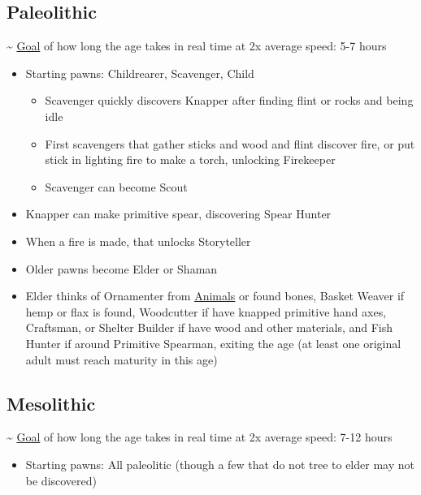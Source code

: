 \documentclass[11pt]{article}
\begin{document}
\subsection{Paleolithic}
\label{sec:org53bf398}
\textasciitilde{} \hyperref[orgd0c5ba7]{Goal} of how long the age takes in real time at 2x average speed: 5-7 hours\\
\begin{itemize}
\item Starting pawns: Childrearer, Scavenger, Child\\
\begin{itemize}
\item Scavenger quickly discovers Knapper after finding flint or rocks and being idle\\
\item First scavengers that gather sticks and wood and flint discover fire, or put stick in lighting fire to make a torch, unlocking Firekeeper\\
\item Scavenger can become Scout\\
\end{itemize}
\item Knapper can make primitive spear, discovering Spear Hunter\\
\item When a fire is made, that unlocks Storyteller\\
\item Older pawns become Elder or Shaman\\
\item Elder thinks of Ornamenter from \hyperref[orgb1f888f]{Animals} or found bones, Basket Weaver if hemp or flax is found, Woodcutter if have knapped primitive hand axes, Craftsman, or Shelter Builder if have wood and other materials, and Fish Hunter if around Primitive Spearman, exiting the age (at least one original adult must reach maturity in this age)\\
\end{itemize}
\subsection{Mesolithic}
\label{sec:orgc92d7cd}
\textasciitilde{} \hyperref[orgd0c5ba7]{Goal} of how long the age takes in real time at 2x average speed: 7-12 hours\\
\begin{itemize}
\item Starting pawns: All paleolitic (though a few that do not tree to elder may not be discovered)\\
\end{itemize}
\end{document}
